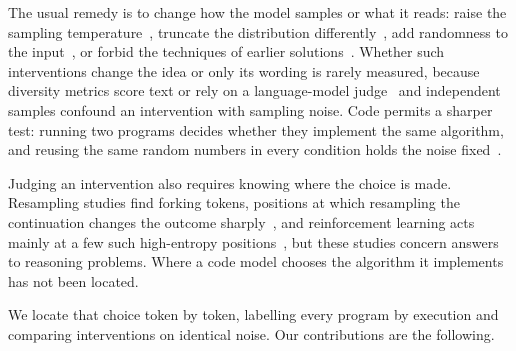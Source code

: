 \documentclass[11pt,letterpaper]{article}
\begin{document}
The usual remedy is to change how the model samples or what it reads: raise the sampling temperature~\citep{Peeperkorn2024}, truncate the distribution differently~\citep{Nguyen2024}, add randomness to the input~\citep{Nagarajan2025}, or forbid the techniques of earlier solutions~\citep{Lu2025}. Whether such interventions change the idea or only its wording is rarely measured, because diversity metrics score text or rely on a language-model judge~\citep{Lee2025} and independent samples confound an intervention with sampling noise. Code permits a sharper test: running two programs decides whether they implement the same algorithm, and reusing the same random numbers in every condition holds the noise fixed~\citep{Ravfogel2024}.

Judging an intervention also requires knowing where the choice is made. Resampling studies find forking tokens, positions at which resampling the continuation changes the outcome sharply~\citep{Bigelow2024}, and reinforcement learning acts mainly at a few such high-entropy positions~\citep{Wang2025,Meng2026}, but these studies concern answers to reasoning problems. Where a code model chooses the algorithm it implements has not been located.

We locate that choice token by token, labelling every program by execution and comparing interventions on identical noise. Our contributions are the following.
\end{document}
